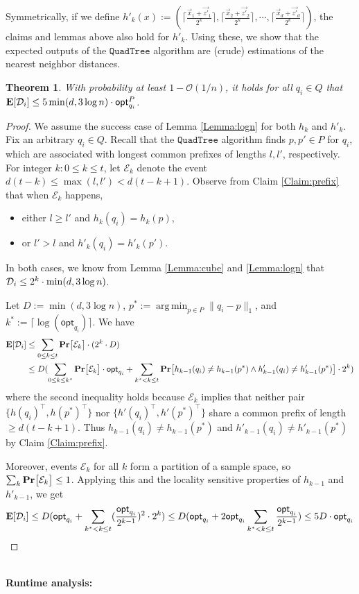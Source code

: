 \documentclass[11pt]{article}
\theoremstyle{plain}
\newtheorem{theorem}{Theorem}[section]
\newcommand{\OO}{\mathcal{O}}
\newcommand{\pr}[1]{\text{\bf Pr}\normalfont\bigl[ #1 \bigr]}
\DeclareMathOperator*{\argmin}{arg\,min}
\newcommand{\e}[1]{\text{\bf E}\normalfont\lbrack #1 \rbrack}
\newcommand{\opt}{\mathsf{opt}}
\newcommand{\QuadTree}{\texttt{QuadTree}} \usepackage{microtype}
\begin{document}
Symmetrically, if we define $h'_k(x) := (\lceil\frac{\vec{x}_1+\vec{z'}_1}{2^k}\rceil, \lceil\frac{\vec{x}_2+\vec{z'}_2}{2^k}\rceil, \cdots, \lceil\frac{\vec{x}_d+\vec{z'}_d}{2^k}\rceil)$, the  claims and lemmas above also hold for $h'_k$.
Using these, we show that the expected outputs of the $\QuadTree$ algorithm are (crude) estimations of the nearest neighbor distances. 

\begin{theorem}\label{Theorem:quadtree}
    With probability at least $1 - \OO(1/n)$, it holds for all $q_i \in Q$ that $\e{\mathcal{D}_i} \leq 5 \min (d, 3\log n) \cdot \opt_{q_i}^P$.
\end{theorem}

\begin{proof}
We assume the success case of Lemma \ref{Lemma:logn} for both $h_k$ and $h'_k$. Fix an arbitrary $q_i \in Q$. Recall that the $\QuadTree$ algorithm finds $p, p' \in P$ for $q_i$, which are associated with longest common prefixes of lengths $l, l'$, respectively. For integer $k: 0 \leq k \leq t$, let $\mathcal{E}_k$ denote the event $d(t-k) \leq \max{(l, l')} < d(t-k + 1)$. Observe from Claim \ref{Claim:prefix} that when $\mathcal{E}_k$ happens,
\begin{itemize}
    \item either $l \geq l'$ and $h_k(q_i) = h_k(p)$, 
    \item or $l' > l$ and $h'_k(q_i) = h'_k(p')$.
\end{itemize}

In both cases, we know from Lemma \ref{Lemma:cube} and \ref{Lemma:logn} that $\mathcal{D}_i \leq 2^k \cdot \min (d, 3\log n)$.

Let ${{D}} := \min (d, 3\log n)$, $p^* := \argmin_{p \in P} \lVert q_i-p\rVert_1$, and $k^* := \lceil\log(\opt_{q_i})\rceil$. We have
    \begin{align*}
    \e{\mathcal{D}_i} &\leq \sum_{0 \leq k \leq t} \pr{\mathcal{E}_k} \cdot (2^k \cdot {{D}}) \\
    &\leq {{D}}(\sum_{0 \leq k \leq k^*} \pr{\mathcal{E}_k } \cdot \opt_{q_i}  + \sum_{k^* < k \leq t} \pr{h_{k-1}(q_i) \neq h_{k-1}(p^*) \wedge h'_{k-1}(q_i) \neq h'_{k-1}(p^*)} \cdot 2^k)
\end{align*}
where the second inequality holds because $\mathcal{E}_k$ implies that neither pair $\{h(q_i)^\top, h(p^*)^\top\}$ nor $\{h'(q_i)^\top, h'(p^*)^\top\}$ share a common prefix of length $\geq d(t-k+1)$. Thus $h_{k-1}(q_i) \neq h_{k-1}(p^*)
$ and $h'_{k-1}(q_i) \neq h'_{k-1}(p^*)$ by Claim \ref{Claim:prefix}. 

Moreover, events $\mathcal{E}_k$ for all $k$ form a partition of a sample space, so $\sum_k \pr{\mathcal{E}_k } \leq 1$.  Applying this and the locality sensitive properties of $h_{k-1}$ and $h'_{k-1}$, we get
\[ 
    \e{\mathcal{D}_i} \leq {{D}}(\opt_{q_i} + \sum_{k^* < k \leq t} (\frac{\opt_{q_i}}{2^{k-1}})^2 \cdot 2^k) 
    \leq {{D}}(\opt_{q_i} + 2\opt_{q_i}\sum_{k^* < k \leq t} \frac{\opt_{q_i}}{2^{k-1}}) 
    \leq 5{{D}} \cdot \opt_{q_i}
\]
\end{proof}
\ \\
{\bf Runtime analysis:}  
\end{document}
